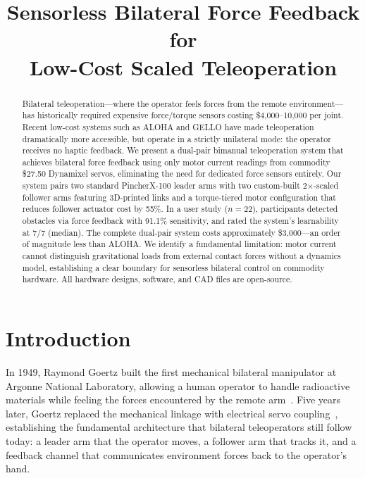 \documentclass[conference]{IEEEtran}
\title{Sensorless Bilateral Force Feedback for\\Low-Cost Scaled Teleoperation}
\author{\IEEEauthorblockN{Leonardo Camacho Pel\'{a}ez}
\IEEEauthorblockA{University of Edinburgh\\
\texttt{leocamacho707@gmail.com}}}
\begin{document}
\maketitle
\setcounter{figure}{0}
\label{fig:hero}

\begin{abstract}
Bilateral teleoperation---where the operator feels forces from the remote environment---has historically required expensive force/torque sensors costing \$4,000--10,000 per joint.
Recent low-cost systems such as ALOHA and GELLO have made teleoperation dramatically more accessible, but operate in a strictly unilateral mode: the operator receives no haptic feedback.
We present a dual-pair bimanual teleoperation system that achieves bilateral force feedback using only motor current readings from commodity \$27.50 Dynamixel servos, eliminating the need for dedicated force sensors entirely.
Our system pairs two standard PincherX-100 leader arms with two custom-built 2$\times$-scaled follower arms featuring 3D-printed links and a torque-tiered motor configuration that reduces follower actuator cost by 55\%.
In a user study ($n = 22$), participants detected obstacles via force feedback with 91.1\% sensitivity, and rated the system's learnability at 7/7 (median).
The complete dual-pair system costs approximately \$3,000---an order of magnitude less than ALOHA.
We identify a fundamental limitation: motor current cannot distinguish gravitational loads from external contact forces without a dynamics model, establishing a clear boundary for sensorless bilateral control on commodity hardware.
All hardware designs, software, and CAD files are open-source.
\end{abstract}

\section{Introduction}

In 1949, Raymond Goertz built the first mechanical bilateral manipulator at Argonne National Laboratory, allowing a human operator to handle radioactive materials while feeling the forces encountered by the remote arm~\cite{goertz1949}. Five years later, Goertz replaced the mechanical linkage with electrical servo coupling~\cite{goertz1954}, establishing the fundamental architecture that bilateral teleoperators still follow today: a leader arm that the operator moves, a follower arm that tracks it, and a feedback channel that communicates environment forces back to the operator's hand.
\end{document}
